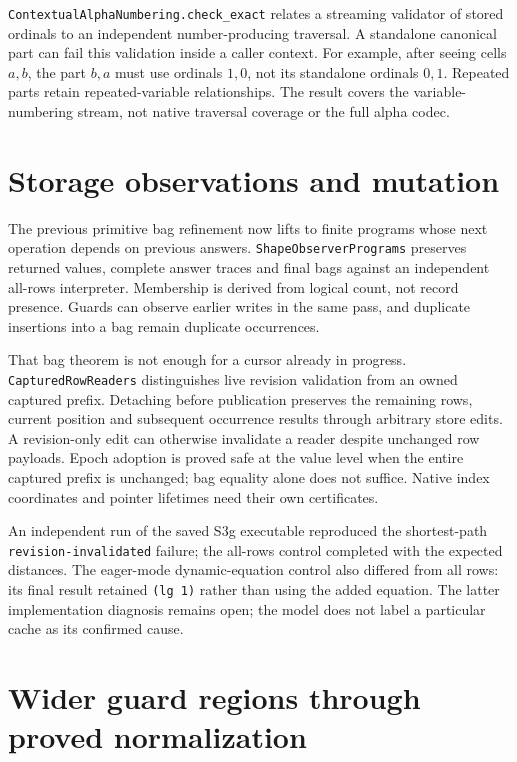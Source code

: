 \documentclass[11pt,a4paper]{article}
\newcommand{\code}[1]{\nolinkurl{#1}}
\begin{document}
\code{ContextualAlphaNumbering.check_exact} relates a streaming validator of
stored ordinals to an independent number-producing traversal. A standalone
canonical part can fail this validation inside a caller context. For example,
after seeing cells $a,b$, the part $b,a$ must use ordinals $1,0$, not its
standalone ordinals $0,1$. Repeated parts retain repeated-variable relationships.
The result covers the variable-numbering stream, not native traversal coverage
or the full alpha codec.

\section{Storage observations and mutation}

The previous primitive bag refinement now lifts to finite programs whose next
operation depends on previous answers. \code{ShapeObserverPrograms} preserves
returned values, complete answer traces and final bags against an independent
all-rows interpreter. Membership is derived from logical count, not record
presence. Guards can observe earlier writes in the same pass, and duplicate
insertions into a bag remain duplicate occurrences.

That bag theorem is not enough for a cursor already in progress.
\code{CapturedRowReaders} distinguishes live revision validation from an owned
captured prefix. Detaching before publication preserves the remaining rows,
current position and subsequent occurrence results through arbitrary store
edits. A revision-only edit can otherwise invalidate a reader despite unchanged
row payloads. Epoch adoption is proved safe at the value level when the entire
captured prefix is unchanged; bag equality alone does not suffice. Native
index coordinates and pointer lifetimes need their own certificates.

An independent run of the saved S3g executable reproduced the shortest-path
\code{revision-invalidated} failure; the all-rows control completed with the
expected distances. The eager-mode dynamic-equation control also differed
from all rows: its final result retained \code{(lg 1)} rather than using the
added equation. The latter implementation diagnosis remains open; the model
does not label a particular cache as its confirmed cause.

\section{Wider guard regions through proved normalization}
\end{document}
